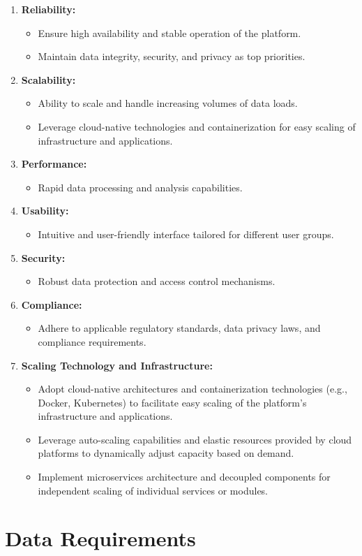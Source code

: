 \begin{enumerate}
  \item \textbf{Reliability:}
  \begin{itemize}
      \item Ensure high availability and stable operation of the platform.
      \item Maintain data integrity, security, and privacy as top priorities.
  \end{itemize}
  
  \item \textbf{Scalability:}
  \begin{itemize}
      \item Ability to scale and handle increasing volumes of data loads.
      \item Leverage cloud-native technologies and containerization for easy
      scaling of infrastructure and applications.
  \end{itemize}
  
  \item \textbf{Performance:}
  \begin{itemize}
      \item Rapid data processing and analysis capabilities.
  \end{itemize}
  
  \item \textbf{Usability:}
  \begin{itemize}
      \item Intuitive and user-friendly interface tailored for different user
      groups.
  \end{itemize}
  
  \item \textbf{Security:}
  \begin{itemize}
      \item Robust data protection and access control mechanisms.
  \end{itemize}
  
  \item \textbf{Compliance:}
  \begin{itemize}
      \item Adhere to applicable regulatory standards, data privacy laws, and
      compliance requirements.
  \end{itemize}
  
  \item \textbf{Scaling Technology and Infrastructure:}
  \begin{itemize}
      \item Adopt cloud-native architectures and containerization technologies
      (e.g., Docker, Kubernetes) to facilitate easy scaling of the platform's
      infrastructure and applications.
      \item Leverage auto-scaling capabilities and elastic resources provided by
      cloud platforms to dynamically adjust capacity based on demand.
      \item Implement microservices architecture and decoupled components for
      independent scaling of individual services or modules.
  \end{itemize}
\end{enumerate}

\section{Data Requirements}

